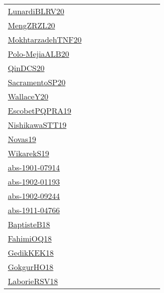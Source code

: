 {\begin{longtable}{p{3cm}p{4cm}p{2cm}p{2cm}p{2cm}p{2cm}p{2cm}p{2cm}p{2cm}p{2cm}}
\href{articles/LunardiBLRV20.pdf}{LunardiBLRV20}~\cite{LunardiBLRV20} &  &  &  &  &  &  &  &  & \\
\href{articles/MengZRZL20.pdf}{MengZRZL20}~\cite{MengZRZL20} &  &  &  &  &  &  &  &  & \\
\href{}{MokhtarzadehTNF20}~\cite{MokhtarzadehTNF20} &  &  &  &  &  &  &  &  & \\
\href{}{Polo-MejiaALB20}~\cite{Polo-MejiaALB20} &  &  &  &  &  &  &  &  & \\
\href{articles/QinDCS20.pdf}{QinDCS20}~\cite{QinDCS20} &  &  &  &  &  &  &  &  & \\
\href{articles/SacramentoSP20.pdf}{SacramentoSP20}~\cite{SacramentoSP20} &  &  &  &  &  &  &  &  & \\
\href{articles/WallaceY20.pdf}{WallaceY20}~\cite{WallaceY20} &  &  &  &  &  &  &  &  & \\
\href{articles/EscobetPQPRA19.pdf}{EscobetPQPRA19}~\cite{EscobetPQPRA19} &  &  &  &  &  &  &  &  & \\
\href{}{NishikawaSTT19}~\cite{NishikawaSTT19} &  &  &  &  &  &  &  &  & \\
\href{articles/Novas19.pdf}{Novas19}~\cite{Novas19} &  &  &  &  &  &  &  &  & \\
\href{articles/WikarekS19.pdf}{WikarekS19}~\cite{WikarekS19} &  &  &  &  &  &  &  &  & \\
\href{articles/abs-1901-07914.pdf}{abs-1901-07914}~\cite{abs-1901-07914} &  &  &  &  &  &  &  &  & \\
\href{articles/abs-1902-01193.pdf}{abs-1902-01193}~\cite{abs-1902-01193} &  &  &  &  &  &  &  &  & \\
\href{articles/abs-1902-09244.pdf}{abs-1902-09244}~\cite{abs-1902-09244} &  &  &  &  &  &  &  &  & \\
\href{articles/abs-1911-04766.pdf}{abs-1911-04766}~\cite{abs-1911-04766} &  &  &  &  &  &  &  &  & \\
\href{articles/BaptisteB18.pdf}{BaptisteB18}~\cite{BaptisteB18} &  &  &  &  &  &  &  &  & \\
\href{articles/FahimiOQ18.pdf}{FahimiOQ18}~\cite{FahimiOQ18} &  &  &  &  &  &  &  &  & \\
\href{articles/GedikKEK18.pdf}{GedikKEK18}~\cite{GedikKEK18} &  &  &  &  &  &  &  &  & \\
\href{}{GokgurHO18}~\cite{GokgurHO18} &  &  &  &  &  &  &  &  & \\
\href{articles/LaborieRSV18.pdf}{LaborieRSV18}~\cite{LaborieRSV18} &  &  &  &  &  &  &  &  & \\

\end{longtable}}
